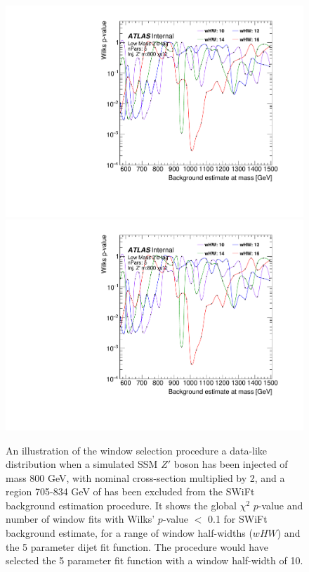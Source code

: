 \begin{figure}[!htb]
\captionsetup[subfigure]{aboveskip=0pt,justification=centering}
\centering
{} {
  \includegraphics[width=0.49\linewidth, angle=0,page=6]{figs/Dibjet/LowMass/FitStudy_min566/windowSel_corrFitCR_dataLike_v11_Zprimebb800_xsFactor2_removeWindow2.pdf}
}\hspace{-8mm}
 {
  \includegraphics[width=0.49\linewidth, angle=0,page=8]{figs/Dibjet/LowMass/FitStudy_min566/windowSel_corrFitCR_dataLike_v11_Zprimebb800_xsFactor2_removeWindow2.pdf}
}
\vspace{10pt}
\caption{\label{fig:windowSel_Zprimebb800_xsFactor2}
  An illustration of the window selection procedure a data-like distribution when
  a simulated SSM $Z'$ boson has been injected of mass 800 GeV, with nominal cross-section multiplied by 2,
  and a region 705-834 GeV of has been excluded from the SWiFt background estimation procedure.
  It shows the global $\chi^{2}$ \mbox{$p$-value} %
  and number of window fits with Wilks' \mbox{$p$-value} $<$ 0.1 for SWiFt background estimate,
  for a range of window half-widths ($wHW$) and the 5 parameter dijet fit function.
  The procedure would have selected the 5 parameter fit function with a window half-width of 10.
}
\end{figure}

